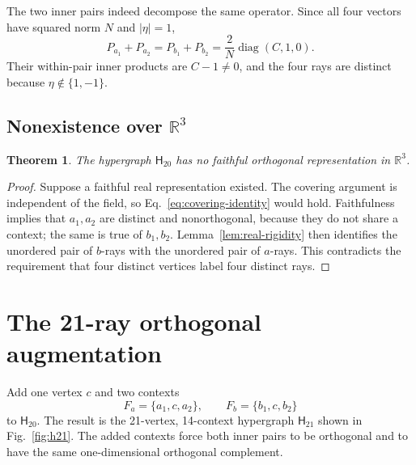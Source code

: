 \documentclass[12pt,a4paper]{article}
\newtheorem{theorem}{Theorem}
\theoremstyle{definition}
\theoremstyle{remark}
\newcommand{\R}{\mathbb R}
\newcommand{\Htwenty}{\mathsf H_{20}}
\newcommand{\Htwentyone}{\mathsf H_{21}}
\begin{document}
The two inner pairs indeed decompose the same operator.  Since all four
vectors have squared norm $N$ and $|\eta|=1$,
\begin{equation}
 P_{a_1}+P_{a_2}=P_{b_1}+P_{b_2}
 =\frac{2}{N}\operatorname{diag}(C,1,0).
 \label{eq:complex-two-sum}
\end{equation}
Their within-pair inner products are $C-1\ne0$, and the four rays are
distinct because $\eta\notin\{1,-1\}$.

\subsection{Nonexistence over \texorpdfstring{$\R^3$}{R3}}

\begin{theorem}
\label{thm:h20-real}
The hypergraph $\Htwenty$ has no faithful orthogonal representation in
$\R^3$.
\end{theorem}

\begin{proof}
Suppose a faithful real representation existed.  The covering argument
is independent of the field, so Eq.~\eqref{eq:covering-identity} would
hold.  Faithfulness implies that $a_1,a_2$ are distinct and
nonorthogonal, because they do not share a context; the same is true of
$b_1,b_2$.  Lemma~\ref{lem:real-rigidity} then identifies the unordered
pair of $b$-rays with the unordered pair of $a$-rays.  This contradicts
the requirement that four distinct vertices label four distinct rays.
\end{proof}

\section{The 21-ray orthogonal augmentation}
\label{sec:h21}

Add one vertex $c$ and two contexts
\begin{equation}
 F_a=\{a_1,c,a_2\},\qquad F_b=\{b_1,c,b_2\}
 \label{eq:added-contexts}
\end{equation}
to $\Htwenty$.  The result is the 21-vertex, 14-context hypergraph
$\Htwentyone$ shown in Fig.~\ref{fig:h21}.  The added contexts force both
inner pairs to be orthogonal and to have the same one-dimensional
orthogonal complement.
\end{document}
